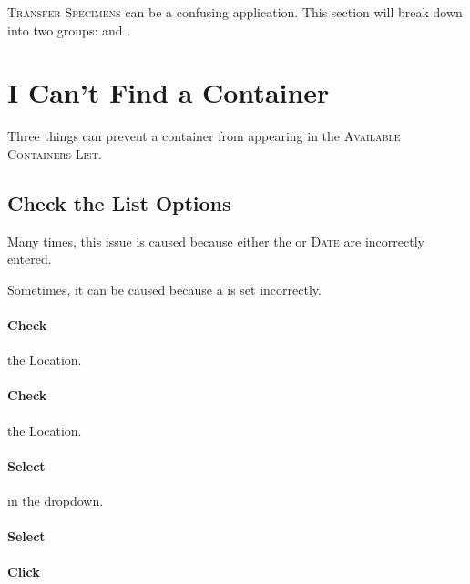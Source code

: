 \textsc{Transfer Specimens} can be a confusing application. This section will break down into two groups:  and .

\section{I Can't Find a Container}

Three things can prevent a container from appearing in the \textsc{Available Containers List}.\\


\subsection{Check the List Options}

Many times, this issue is caused because either the  or \textsc{Date} are incorrectly entered.

Sometimes, it can be caused because a  is set incorrectly.

\paragraph{Check} the  Location.

\paragraph{Check} the  Location.

\paragraph{Select}  in the  dropdown.

\paragraph{Select} 

\paragraph{Click} \\


